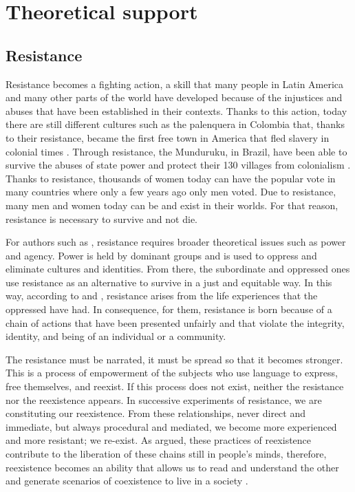 \documentclass[english]{textolivre}
\begin{document}
\section{Theoretical support}\label{sec-theoret}
\subsection{Resistance}\label{subsec-resist}
Resistance becomes a fighting action, a skill that many people in Latin America and many other parts of the world have developed because of the injustices and abuses that have been established in their contexts. Thanks to this action, today there are still different cultures such as the palenquera in Colombia that, thanks to their resistance, became the first free town in America that fled slavery in colonial times \cite{larepublica2022}. Through resistance, the Munduruku, in Brazil, have been able to survive the abuses of state power and protect their 130 villages from colonialism \cite{opendemocracy2022resistencia}. Thanks to resistance, thousands of women today can have the popular vote in many countries where only a few years ago only men voted. Due to resistance, many men and women today can be and exist in their worlds. For that reason, resistance is necessary to survive and not die.

For authors such as \textcite{giroux1983}, resistance requires broader theoretical issues such as power and agency. Power is held by dominant groups and is used to oppress and eliminate cultures and identities. From there, the subordinate and oppressed ones use resistance as an alternative to survive in a just and equitable way. In this way, according to \textcite{giroux1983} and \textcite{davis1983}, resistance arises from the life experiences that the oppressed have had. In consequence, for them, resistance is born because of a chain of actions that have been presented unfairly and that violate the integrity, identity, and being of an individual or a community.

The resistance must be narrated, it must be spread so that it becomes stronger. This is a process of empowerment of the subjects who use language to express, free themselves, and reexist. If this process does not exist, neither the resistance nor the reexistence appears. In successive experiments of resistance, we are constituting our reexistence. From these relationships, never direct and immediate, but always procedural and mediated, we become more experienced and more resistant; we re-exist. As \textcite{walsh2009interculturalidad} argued, these practices of reexistence contribute to the liberation of these chains still in people’s minds, therefore, reexistence becomes an ability that allows us to read and understand the other and generate scenarios of coexistence to live in a society \cite{alban2008}.
\end{document}
